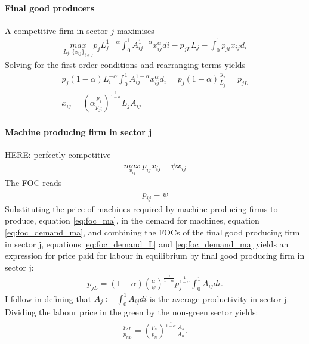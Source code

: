 \paragraph{Final good producers}
A competitive firm in sector $j$ maximises
\begin{align*}
\underset{L_j, \{x_{ij}\}_{i \in I}}{max} p_{j} L_j^{1-\alpha} \int_{0}^{1}A_{ij}^{1-\alpha}x_{ij}^\alpha di - p_{jL} L_j - \int_{0}^{1} p_{ji}x_{ij} d_i
\end{align*}
Solving for the first order conditions and rearranging terms yields
\begin{align}
p_j(1-\alpha) L_i^{-\alpha}\int_{0}^{1}A_{ij}^{1-\alpha}x_{ij}^\alpha d_i= p_j (1-\alpha)\frac{y_j}{L_j}=p_{jL}\label{eq:foc_demand_L}
\\
x_{ij} = \left(\alpha\frac{p_j}{p_{ji}}\right)^\frac{1}{1-\alpha}L_j A_{ij}\label{eq:foc_demand_ma}
\end{align}

\paragraph{Machine producing firm in sector j}
HERE: perfectly competitive
\begin{align*}
\underset{x_{ij}}{max}\  p_{ij}x_{ij}-\psi x_{ij}
\end{align*}
The FOC reads
\begin{align}\label{eq:foc_ma}
p_{ij}=\psi
\end{align}
Substituting the price of machines required by machine producing firms to produce,  equation \ref{eq:foc_ma}, in the demand for machines, equation \ref{eq:foc_demand_ma}, and combining the FOCs of the final good producing firm in sector j, equations \ref{eq:foc_demand_L} and \ref{eq:foc_demand_ma} yields an expression for price paid for labour in equilibrium by final good producing firm in sector j:
\begin{align}
p_{jL}= (1-\alpha)\left(\frac{\alpha}{\psi}\right)^\frac{\alpha}{1-\alpha}p_j^\frac{1}{1-\alpha}\int_{0}^{1} A_{ij} di.
\end{align}
I follow \cite{Acemoglu2012TheChange} in defining that $A_j:=\int_{0}^{1}A_{ij}di$ is the average productivity in sector j. 
Dividing the labour price in the green by the non-green sector yields:
\begin{align}
\frac{p_{sL}}{p_{nL}}= \left(\frac{p_s}{p_n}\right)^\frac{1}{1-\alpha} \frac{A_s}{A_n}.\label{eq:firms_labrel}
\end{align}

